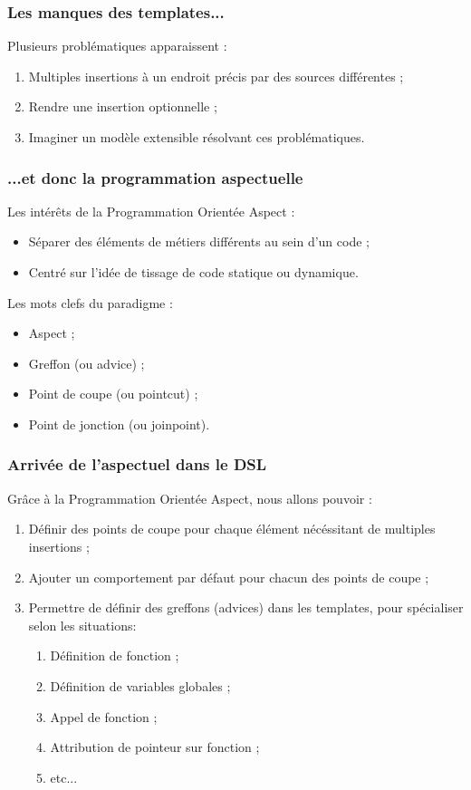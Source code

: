 \documentclass[]{beamer}
\begin{document}
\begin{frame}
\frametitle{Les manques des templates...}
Plusieurs problématiques apparaissent :
\begin{enumerate}
    \item Multiples insertions à un endroit précis par des sources
        différentes ;
    \item Rendre une insertion optionnelle ;
    \item Imaginer un modèle extensible résolvant ces problématiques.
\end{enumerate}
\end{frame}

\begin{frame}
\frametitle{...et donc la programmation aspectuelle}
 {
    Les intérêts de la Programmation Orientée Aspect :
    \begin{itemize}
        \item Séparer des éléments de métiers différents au sein d'un code ;
        \item Centré sur l'idée de tissage de code statique ou dynamique.
    \end{itemize}
}
 {
    Les mots clefs du paradigme :
    \begin{itemize}
        \item Aspect ;
        \item Greffon (ou advice) ;
        \item Point de coupe (ou pointcut) ;
        \item Point de jonction (ou joinpoint).
    \end{itemize}
}
\end{frame}


\begin{frame}
\frametitle{Arrivée de l'aspectuel dans le DSL}
Grâce à la Programmation Orientée Aspect, nous allons pouvoir :
\begin{enumerate}[<+->]
    \item Définir des points de coupe pour chaque élément nécéssitant de
        multiples insertions ;
    \item Ajouter un comportement par défaut pour chacun des points de coupe ;
    \item Permettre de définir des greffons (advices) dans les templates,
        pour spécialiser selon les situations:
        \begin{enumerate}
            \item Définition de fonction ;
            \item Définition de variables globales ;
            \item Appel de fonction ;
            \item Attribution de pointeur sur fonction ;
            \item etc...
        \end{enumerate}
\end{enumerate}
\end{frame}
\end{document}
